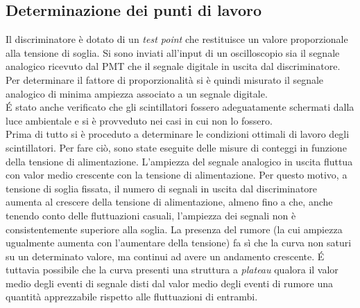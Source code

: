 \documentclass[11pt]{article}
\begin{document}
\begin{flushleft}
\subsection{Determinazione dei punti di lavoro}
Il discriminatore è dotato di un \textit{test point} che restituisce un valore proporzionale alla tensione di soglia. Si sono inviati all'input di un oscilloscopio sia il segnale analogico ricevuto dal PMT che il segnale digitale in uscita dal discriminatore. Per determinare il fattore di proporzionalità si è quindi misurato il segnale analogico di minima ampiezza associato a un segnale digitale. 
\\
\'E stato anche verificato che gli scintillatori fossero adeguatamente schermati dalla luce ambientale e si è provveduto nei casi in cui non lo fossero.
\\
Prima di tutto si è proceduto a determinare le condizioni ottimali di lavoro degli scintillatori. Per fare ciò, sono state eseguite delle misure di conteggi in funzione della tensione di alimentazione. L'ampiezza del segnale analogico in uscita fluttua con valor medio crescente con la tensione di alimentazione. Per questo motivo, a tensione di soglia fissata, il numero di segnali in uscita dal discriminatore aumenta al crescere della tensione di alimentazione, almeno fino a che, anche tenendo conto delle fluttuazioni casuali, l'ampiezza dei segnali non è consistentemente superiore alla soglia. La presenza del rumore (la cui ampiezza ugualmente aumenta con l'aumentare della tensione) fa sì che la curva non saturi su un determinato valore, ma continui ad avere un andamento crescente.
\'E tuttavia possibile che la curva presenti una struttura a \textit{plateau} qualora il valor medio degli eventi di segnale disti dal valor medio degli eventi di rumore una quantità apprezzabile rispetto alle fluttuazioni di entrambi. \newpage


\end{flushleft}
\end{document}
